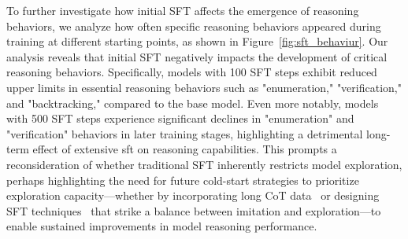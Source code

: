 \documentclass{article} %
\newcommand{\jh}[1]{\textcolor{magenta}{\bf\small [#1 --JH]}}
\newcommand{\jhc}[2]{\bgroup\textcolor{magenta}{\sout{#1} #2}\egroup}
\begin{document}


To further investigate how initial SFT affects the emergence of reasoning behaviors, we analyze how often specific reasoning behaviors appeared during training at different starting points, as shown in Figure~\ref{fig:sft_behaviur}. Our analysis reveals that initial SFT negatively impacts the development of critical reasoning behaviors. Specifically, models with 100 SFT steps exhibit reduced upper limits in essential reasoning behaviors such as "enumeration," "verification," and "backtracking," compared to the base model. Even more notably, models with 500 SFT steps experience significant declines in "enumeration" and "verification" behaviors in later training stages, highlighting a detrimental long-term effect of extensive sft on reasoning capabilities.
This prompts a reconsideration of whether traditional SFT inherently restricts model exploration, perhaps highlighting the need for future cold-start strategies to prioritize exploration capacity—whether by incorporating long CoT data~\citep{guo2025deepseek,yeo2025demystifying} or designing SFT techniques~\citep{li2025preserving} that strike a balance between imitation and exploration—to enable sustained improvements in model reasoning performance.
\end{document}
